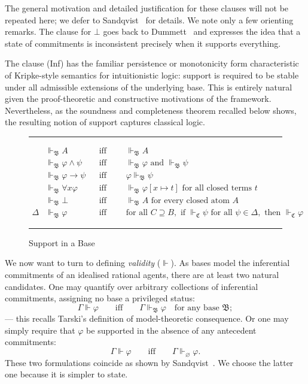 \documentclass[reqno]{asl}
\newcommand{\supp}{\Vdash}
\newcommand{\base}[1]{\mathfrak{#1}}
\renewcommand{\emptyset}{\varnothing}
\begin{document}
The general motivation and detailed justification for these clauses will not be repeated here; we defer to Sandqvist~\cite{Sandqvist2005inferentialist,Sandqvist_2009} for details. We note only a few orienting remarks. The clause for $\bot$ goes back to Dummett~\cite{dummett1991logicalbasis} and expresses the idea that a state of commitments is inconsistent precisely when it supports everything. 

The clause (Inf) has the familiar persistence or monotonicity form characteristic of Kripke-style semantics for intuitionistic logic: support is required to be stable under all admissible extensions of the underlying base. This is entirely natural given the proof-theoretic and constructive motivations of the framework. Nevertheless, as the soundness and completeness theorem recalled below shows, the resulting notion of support captures classical logic.

\begin{figure}
\hrule
\begin{align*}
&\supp_{\base{B}} A &&\text{iff } \qquad \supp_{\base{B}} A \tag{At}\\
&\supp_{\base{B}} \varphi \land \psi &&\text{iff } \qquad \supp_{\base{B}} \varphi \text{ and } \supp_{\base{B}} \psi \tag{$\land$}\\
&\supp_{\base{B}} \varphi \to \psi &&\text{iff } \qquad \varphi \supp_{\base{B}} \psi \tag{$\to$}\\
&\supp_{\base{B}} \forall x\varphi &&\text{iff } \qquad \supp_{\base{B}} \varphi[x \mapsto t] \text{ for all closed terms } t \tag{$\forall$}\\
&\supp_{\base{B}} \bot &&\text{iff } \qquad \supp_{\base{B}} A \text{ for every closed atom } A \tag{$\bot$}\\
\Delta &\supp_{\base{B}} \varphi &&\text{iff } \qquad \text{for all } C \supseteq B, \text{ if } \supp_{\base{C}} \psi \text{ for all } \psi \in \Delta, \text{ then } \supp_{\base{C}} \varphi \tag{Inf}
\end{align*}
\hrule
\caption{Support in a Base}
\label{fig:support}
\end{figure}

We now want to turn to defining \textit{validity} ($\supp$). 
As bases model the inferential commitments of an 
idealised rational agents, there are at least two natural candidates. One may quantify over arbitrary 
collections of inferential commitments, assigning no base a privileged 
status:
\[
    \Gamma \supp \varphi \qquad \mbox{iff} \qquad \Gamma \supp_{\base{B}} \varphi \quad \text{for any base } \base{B};
\]
--- this recalls Tarski's definition of model-theoretic consequence. Or one may simply require that $\varphi$ be supported in the absence of 
any antecedent commitments:
\[
   \Gamma \supp \varphi \qquad \mbox{iff} \qquad \Gamma \supp_{\emptyset} \varphi.
\]
These two formulations coincide as shown by Sandqvist~\cite{Sandqvist_2009}. We choose the latter one because it is simpler to state.
\end{document}
